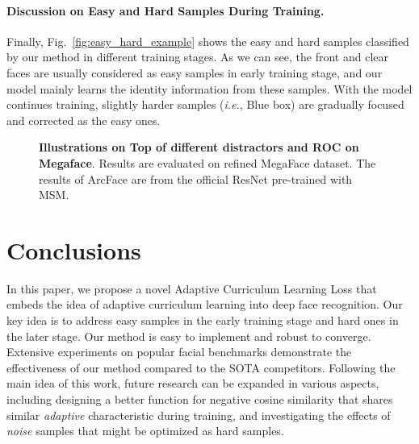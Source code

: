 \documentclass[10pt,twocolumn,letterpaper]{article}
\def\figvspace{{\vspace{-2mm}}}
\begin{document}
\paragraph{Discussion on Easy and Hard Samples During Training.}
Finally, Fig.~\ref{fig:easy_hard_example} shows the easy and hard samples classified by our method in different training stages.
As we can see, the front and clear faces are usually considered as easy samples in early training stage, and our model mainly learns the identity information from these samples.
With the model continues training, slightly harder samples (\textit{i.e.}, Blue box) are gradually focused and corrected as the easy ones.

\begin{figure}[t!]
\centering
{}\centering
\caption{\small \textbf{Illustrations on Top  of different distractors and ROC on Megaface}. Results are evaluated on refined MegaFace dataset. The results of ArcFace are from the official ResNet pre-trained with MSM.
}
 \label{fig:megaface}\figvspace
\end{figure}













\section{Conclusions}
In this paper, we propose a novel Adaptive Curriculum Learning Loss that embeds the idea of adaptive curriculum learning into deep face recognition.
Our key idea is to address easy samples in the early training stage and hard ones in the later stage.
Our method is easy to implement and robust to converge.
Extensive experiments on popular facial benchmarks demonstrate the effectiveness of our method compared to the SOTA competitors.
Following the main idea of this work, future research can be expanded in various aspects, including designing a better function  for negative cosine similarity that shares similar \textit{adaptive} characteristic during training, and investigating the effects of \textit{noise} samples that might be optimized as hard samples.

{\small


}
\end{document}
